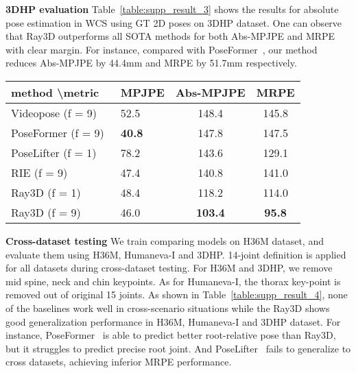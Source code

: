 \documentclass[10pt,twocolumn,letterpaper]{article}
\begin{document}
\noindent\textbf{3DHP evaluation}
Table~\ref{table:supp_result_3} shows the results for absolute pose estimation in WCS using GT 2D poses on 3DHP dataset. One can observe that Ray3D outperforms all SOTA methods for both Abs-MPJPE and MRPE with clear margin. For instance, compared with PoseFormer~\cite{ce2021poseformer}, our method reduces Abs-MPJPE by 44.4mm and MRPE by 51.7mm respectively. 

\begin{table*}[htbp]
\centering
\caption{Quantitative evaluation results under MPJPE, Abs-MPJPE and MRPE on 3DHP using GT as 2D input. (f = 9) means this approach utilizes 9 consecutive frames for pose estimation, and (f = 1) means the approach does not make use of temporal information. Best results are shown in \textbf{bold}.}
\begin{tabular}{@{}l|lcc}
\toprule
method \textbackslash metric                                    & MPJPE        & Abs-MPJPE        & MRPE  \\ \midrule
Videopose (f = 9)~\cite{dario2019videopose}                     & 52.5         & 148.4            & 145.8 \\
PoseFormer (f = 9)~\cite{ce2021poseformer}                      & \textbf{40.8}& 147.8            & 147.5 \\
PoseLifter (f = 1)~\cite{ju2019absposelifter}                   & 78.2         & 143.6            & 129.1 \\
RIE (f = 9)~\cite{wenkang2021improving}                         & 47.4         & 140.8            & 141.0 \\
Ray3D (f = 1)                                                   & 48.4         & 118.2            & 114.0 \\
Ray3D (f = 9)                                                   & 46.0         & \textbf{103.4}   & \textbf{95.8} \\\bottomrule
\end{tabular}
\label{table:supp_result_3}
\end{table*}

\noindent\textbf{Cross-dataset testing}
We train comparing models on H36M dataset, and evaluate them using H36M, Humaneva-I and 3DHP. 14-joint definition is applied for all datasets during cross-dataset testing. For H36M and 3DHP, we remove mid spine, neck and chin keypoints. As for Humaneva-I, the thorax key-point is removed out of original 15 joints. As shown in Table~\ref{table:supp_result_4}, none of the baselines work well in cross-scenario situations while the Ray3D shows good generalization performance in H36M, Humaneva-I and 3DHP dataset. For instance, PoseFormer~\cite{ce2021poseformer} is able to predict better root-relative pose than Ray3D, but it struggles to predict precise root joint. And PoseLifter~\cite{ju2019absposelifter} fails to generalize to cross datasets, achieving inferior MRPE performance.
\end{document}
